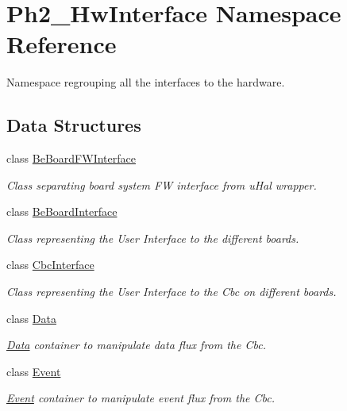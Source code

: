 \hypertarget{namespace_ph2___hw_interface}{\section{Ph2\-\_\-\-Hw\-Interface Namespace Reference}
\label{namespace_ph2___hw_interface}
}


Namespace regrouping all the interfaces to the hardware.  


\subsection*{Data Structures}
\begin{DoxyCompactItemize}
\item 
class \hyperlink{class_ph2___hw_interface_1_1_be_board_f_w_interface}{Be\-Board\-F\-W\-Interface}
\begin{DoxyCompactList}\small\item\em Class separating board system F\-W interface from u\-Hal wrapper. \end{DoxyCompactList}\item 
class \hyperlink{class_ph2___hw_interface_1_1_be_board_interface}{Be\-Board\-Interface}
\begin{DoxyCompactList}\small\item\em Class representing the User Interface to the different boards. \end{DoxyCompactList}\item 
class \hyperlink{class_ph2___hw_interface_1_1_cbc_interface}{Cbc\-Interface}
\begin{DoxyCompactList}\small\item\em Class representing the User Interface to the Cbc on different boards. \end{DoxyCompactList}\item 
class \hyperlink{class_ph2___hw_interface_1_1_data}{Data}
\begin{DoxyCompactList}\small\item\em \hyperlink{class_ph2___hw_interface_1_1_data}{Data} container to manipulate data flux from the Cbc. \end{DoxyCompactList}\item 
class \hyperlink{class_ph2___hw_interface_1_1_event}{Event}
\begin{DoxyCompactList}\small\item\em \hyperlink{class_ph2___hw_interface_1_1_event}{Event} container to manipulate event flux from the Cbc. \end{DoxyCompactList}\item 

\end{DoxyCompactItemize}
